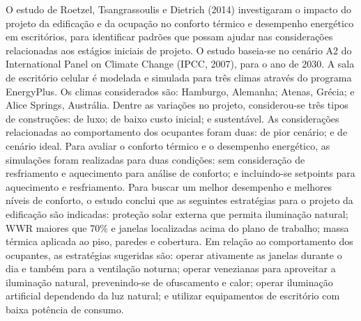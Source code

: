 \documentclass[brazil,hardcopy,openany,a5paper]{ufscthesis}
\begin{document}
	O estudo de Roetzel, Tsangrassoulis e Dietrich (2014) investigaram o impacto do projeto da edificação e da ocupação no conforto térmico e
	desempenho energético em escritórios, para identificar padrões que possam ajudar nas considerações relacionadas aos estágios iniciais de projeto. O estudo baseia-se no cenário A2 do International Panel on Climate Change (IPCC, 2007), para o ano de 2030. A sala de escritório celular é modelada e simulada para três climas através do programa EnergyPlus. Os climas considerados são: Hamburgo, Alemanha; Atenas, Grécia; e Alice Springs, Austrália. Dentre as variações no projeto, considerou-se três tipos de construções: de luxo; de baixo custo inicial; e sustentável. As considerações relacionadas ao comportamento dos ocupantes foram duas: de pior cenário; e de cenário ideal. Para avaliar o conforto térmico e o desempenho energético, as simulações foram realizadas para duas condições: sem consideração de resfriamento e aquecimento para análise de conforto; e incluindo-se setpoints para aquecimento e resfriamento.
	Para buscar um melhor desempenho e melhores níveis de conforto, o estudo conclui que as seguintes estratégias para o projeto da edificação são indicadas: proteção solar externa que permita iluminação natural; WWR maiores que 70\% e janelas localizadas acima do plano de trabalho; massa térmica aplicada ao piso, paredes e cobertura. Em relação ao comportamento dos ocupantes, as estratégias sugeridas são: operar ativamente as janelas durante o dia e também para a ventilação noturna; operar venezianas para aproveitar a iluminação natural, prevenindo-se de ofuscamento e calor; operar iluminação artificial dependendo da luz natural; e utilizar equipamentos de escritório com baixa potência de consumo.
	
\end{document}
